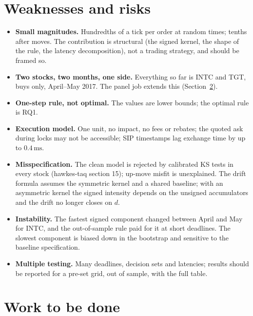 \documentclass[11pt]{article}
\theoremstyle{definition}
\theoremstyle{remark}
\newcommand{\ms}{\,\text{ms}}
\begin{document}
\section{Weaknesses and risks}
\label{sec:weak}

\begin{itemize}
\item \textbf{Small magnitudes.} Hundredths of a tick per order at random times; tenths after moves. The contribution is structural (the signed kernel, the shape of the rule, the latency decomposition), not a trading strategy, and should be framed so.
\item \textbf{Two stocks, two months, one side.} Everything so far is INTC and TGT, buys only, April--May 2017. The panel job extends this (Section~\ref{sec:todo}).
\item \textbf{One-step rule, not optimal.} The values are lower bounds; the optimal rule is RQ1.
\item \textbf{Execution model.} One unit, no impact, no fees or rebates; the quoted ask during locks may not be accessible; SIP timestamps lag exchange time by up to $0.4\ms$.
\item \textbf{Misspecification.} The clean model is rejected by calibrated KS tests in every stock (hawkes-taq section 15); up-move misfit is unexplained. The drift formula assumes the symmetric kernel and a shared baseline; with an asymmetric kernel the signed intensity depends on the unsigned accumulators and the drift no longer closes on $d$.
\item \textbf{Instability.} The fastest signed component changed between April and May for INTC, and the out-of-sample rule paid for it at short deadlines. The slowest component is biased down in the bootstrap and sensitive to the baseline specification.
\item \textbf{Multiple testing.} Many deadlines, decision sets and latencies; results should be reported for a pre-set grid, out of sample, with the full table.
\end{itemize}

\section{Work to be done}
\label{sec:todo}
\end{document}
